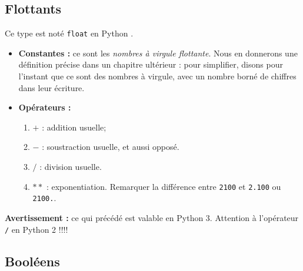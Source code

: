 \subsection{Flottants}
\begin{defi}[Flottants]
Ce type est noté \texttt{float} en Python .
\begin{itemize}
\item  \textbf{Constantes :} ce sont les \emph{nombres à virgule flottante}. Nous en
donnerons une définition précise dans un chapitre ultérieur : pour simplifier, disons pour 
l'instant que ce sont des nombres à virgule, avec un nombre borné de chiffres dans leur écriture.
\item \textbf{Opérateurs : }
\begin{enumerate}
 \item $+$ : addition usuelle;
 \item $-$ : soustraction usuelle, et aussi opposé.
\item  $/$ : division usuelle.
\item $**$ : exponentiation. Remarquer la différence entre \texttt{2\raisebox{0.3ex}{**}100} et 
\texttt{2.\raisebox{0.3ex}{**}100} ou \texttt{2\raisebox{0.3ex}{**}100.}.
\end{enumerate}
\end{itemize}
\noindent\textbf{Avertissement :} ce qui précédé est valable en Python 3. Attention à l'opérateur 
\texttt{/} en Python 2 !!!!
\end{defi}

\subsection{Booléens}


